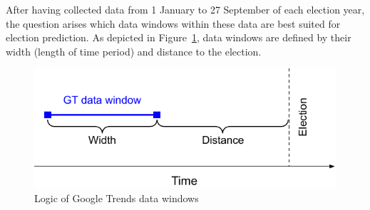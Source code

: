 \documentclass[
  letterpaper,
  DIV=11,
  numbers=noendperiod]{scrartcl}
\begin{document}
After having collected data from 1 January to 27 September of each
election year, the question arises which data windows within these data
are best suited for election prediction. As depicted in
Figure~\ref{fig-2}, data windows are defined by their width (length of
time period) and distance to the election.

\begin{figure}[h]

\caption{\label{fig-2}Logic of Google Trends data windows}

{\centering \includegraphics{Figure_2_data_window_logic.pdf}

}

\end{figure}
\end{document}
